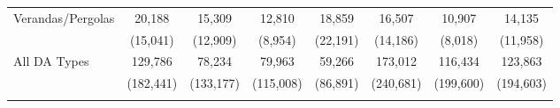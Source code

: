 \begin{table}[t!]
{\begin{threeparttable}
\begin{tabular}{rccccccc}
    \multicolumn{1}{l}{Verandas/Pergolas} & 20,188 & 15,309 & 12,810 & 18,859 & 16,507 & 10,907 & 14,135 \\
          & (15,041) & (12,909) & (8,954) & (22,191) & (14,186) & (8,018) & (11,958) \\
    \multicolumn{1}{l}{All DA Types} & 129,786 & 78,234 & 79,963 & 59,266 & 173,012 & 116,434 & 123,863 \\
          & (182,441) & (133,177) & (115,008) & (86,891) & (240,681) & (199,600) & (194,603) \\
    \bottomrule \\ [-2ex] 
    \end{tabular}%
   
   \begin{tablenotes}
  \LARGE
\end{tablenotes}   
    
 \end{threeparttable}  
    
    }%
   

\end{table}%
